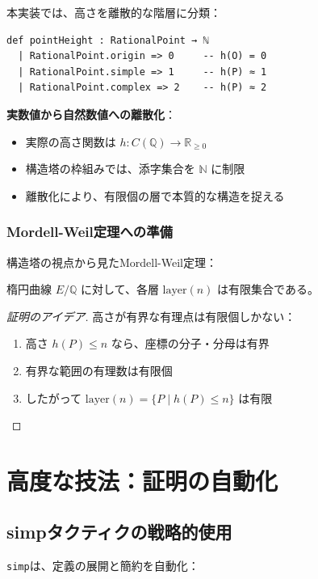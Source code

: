 \documentclass{ltjsarticle}
\begin{document}
本実装では、高さを離散的な階層に分類：

\begin{lstlisting}[caption=pointHeightの定義]
def pointHeight : RationalPoint → ℕ
  | RationalPoint.origin => 0     -- h(O) = 0
  | RationalPoint.simple => 1     -- h(P) ≈ 1
  | RationalPoint.complex => 2    -- h(P) ≈ 2
\end{lstlisting}

\textbf{実数値から自然数値への離散化}：
\begin{itemize}
\item 実際の高さ関数は $h : C(\mathbb{Q}) \to \mathbb{R}_{\ge 0}$
\item 構造塔の枠組みでは、添字集合を $\mathbb{N}$ に制限
\item 離散化により、有限個の層で本質的な構造を捉える
\end{itemize}

\subsubsection{Mordell-Weil定理への準備}

構造塔の視点から見たMordell-Weil定理：

\begin{theorem}
楕円曲線 $E/\mathbb{Q}$ に対して、各層 $\text{layer}(n)$ は有限集合である。
\end{theorem}

\begin{proof}[証明のアイデア]
高さが有界な有理点は有限個しかない：
\begin{enumerate}
\item 高さ $h(P) \le n$ なら、座標の分子・分母は有界
\item 有界な範囲の有理数は有限個
\item したがって $\text{layer}(n) = \{P \mid h(P) \le n\}$ は有限
\end{enumerate}
\end{proof}

\section{高度な技法：証明の自動化}

\subsection{simpタクティクの戦略的使用}

\texttt{simp}は、定義の展開と簡約を自動化：
\end{document}
